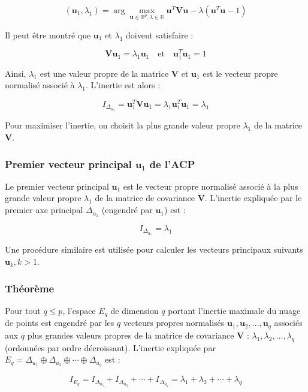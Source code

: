 \documentclass[10pt,a4paper]{article}
\begin{document}
\[
(\mathbf{u}_1, \lambda_1) = \arg \max_{\mathbf{u} \in \mathbb{R}^p, \lambda \in \mathbb{R}} \mathbf{u}^T \mathbf{V} \mathbf{u} - \lambda (\mathbf{u}^T \mathbf{u} - 1)
\]

Il peut être montré que $\mathbf{u}_1$ et $\lambda_1$ doivent satisfaire :

\[
\mathbf{V} \mathbf{u}_1 = \lambda_1 \mathbf{u}_1 \quad \text{et} \quad \mathbf{u}_1^T \mathbf{u}_1 = 1
\]

Ainsi, $\lambda_1$ est une valeur propre de la matrice $\mathbf{V}$ et $\mathbf{u}_1$ est le vecteur propre normalisé associé à $\lambda_1$. L'inertie est alors :

\[
I_{\Delta_{u_1}} = \mathbf{u}_1^T \mathbf{V} \mathbf{u}_1 = \lambda_1 \mathbf{u}_1^T \mathbf{u}_1 = \lambda_1
\]

Pour maximiser l'inertie, on choisit la plus grande valeur propre $\lambda_1$ de la matrice $\mathbf{V}$.

\subsubsection*{Premier vecteur principal $\mathbf{u}_1$ de l'ACP}
Le premier vecteur principal $\mathbf{u}_1$ est le vecteur propre normalisé associé à la plus grande valeur propre $\lambda_1$ de la matrice de covariance $\mathbf{V}$. L'inertie expliquée par le premier axe principal $\Delta_{u_1}$ (engendré par $\mathbf{u}_1$) est :

\[
I_{\Delta_{u_1}} = \lambda_1
\]

Une procédure similaire est utilisée pour calculer les vecteurs principaux suivants $\mathbf{u}_k, k > 1$.

\subsubsection*{Théorème}
Pour tout $q \leq p$, l'espace $E_q$ de dimension $q$ portant l'inertie maximale du nuage de points est engendré par les $q$ vecteurs propres normalisés $\mathbf{u}_1, \mathbf{u}_2, \ldots, \mathbf{u}_q$ associés aux $q$ plus grandes valeurs propres de la matrice de covariance $\mathbf{V}$ : $\lambda_1, \lambda_2, \ldots, \lambda_q$ (ordonnées par ordre décroissant). L'inertie expliquée par $E_q = \Delta_{u_1} \oplus \Delta_{u_2} \oplus \cdots \oplus \Delta_{u_q}$ est :

\[
I_{E_q} = I_{\Delta_{u_1}} + I_{\Delta_{u_2}} + \cdots + I_{\Delta_{u_q}} = \lambda_1 + \lambda_2 + \cdots + \lambda_q
\]
\end{document}

